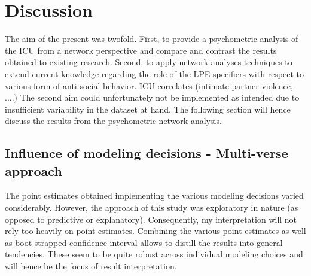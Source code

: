 
\section{Discussion}
The aim of the present was twofold. 
First, to provide a psychometric analysis of the ICU from a network perspective and compare and contrast the results obtained to existing research.
Second, to apply network analyses techniques to extend current knowledge regarding the role of the LPE specifiers with respect to 
various form of anti social behavior. ICU correlates (intimate partner violence, ....)
The second aim could unfortunately not be implemented as intended due to insufficient variability in the dataset at hand.
The following section will hence discuss the results from the psychometric network analysis.

\subsection{Influence of modeling decisions - Multi-verse approach}
The point estimates obtained implementing the various modeling decisions varied considerably.
However, the approach of this study was exploratory in nature (as opposed to predictive or explanatory). 
Consequently, my interpretation will not rely too heavily on point estimates.
Combining the various point estimates as well as boot strapped confidence interval allows to distill the results into general tendencies.
These seem to be quite robust across individual modeling choices and will hence be the focus of result interpretation.  


